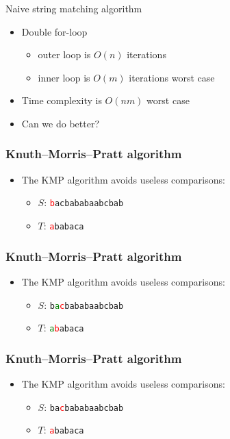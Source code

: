 \documentclass[12pt,t]{beamer}
\newcommand{\bi}{\begin{itemize}}
\newcommand{\ei}{\end{itemize}}
\begin{document}
\begin{frame}{Naive string matching algorithm}
    \vspace{30pt}
    \bi
        \item Double for-loop
            \begin{itemize}
                \item outer loop is $O(n)$ iterations
                \item inner loop is $O(m)$ iterations worst case
            \end{itemize}
        \item Time complexity is $O(nm)$ worst case
        \item<2-> Can we do better?
    \ei
\end{frame}

\begin{frame}
    \frametitle{Knuth--Morris--Pratt algorithm}
    \vspace{30pt}
    \begin{itemize}
    \item The KMP algorithm avoids useless comparisons:
        \begin{itemize}
            \item $S$: \texttt{\textcolor{red}{b}acbababaabcbab}
            \item $T$: \phantom{\texttt{}}\texttt{\textcolor{red}{a}babaca}
        \end{itemize}
    \end{itemize}
\end{frame}
\begin{frame}
    \frametitle{Knuth--Morris--Pratt algorithm}
    \vspace{30pt}
    \begin{itemize}
    \item The KMP algorithm avoids useless comparisons:
        \begin{itemize}
            \item $S$: \texttt{b\textcolor{green}{a}\textcolor{red}{c}bababaabcbab}
            \item $T$: \texttt{\textcolor{green}{a}\textcolor{red}{b}abaca}
        \end{itemize}
    \end{itemize}
\end{frame}
\begin{frame}
    \frametitle{Knuth--Morris--Pratt algorithm}
    \vspace{30pt}
    \begin{itemize}
    \item The KMP algorithm avoids useless comparisons:
        \begin{itemize}
            \item $S$: \texttt{ba\textcolor{red}{c}bababaabcbab}
            \item $T$: \texttt{\textcolor{red}{a}babaca}
        \end{itemize}
    \end{itemize}
\end{frame}
\end{document}
